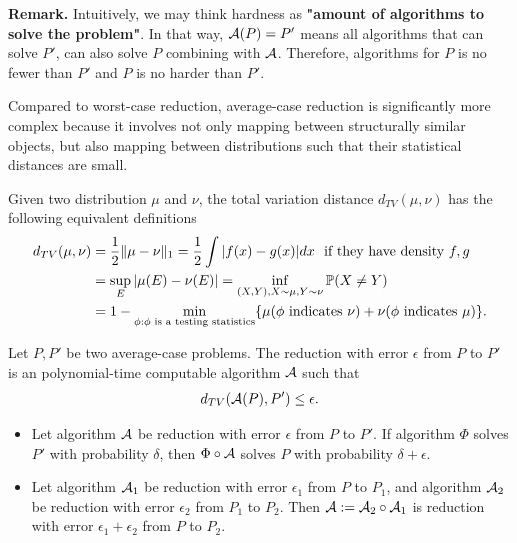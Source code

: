 \textbf{Remark.} Intuitively, we may think hardness as \textbf{"amount of algorithms to solve the problem"}. In that way, $\mathcal{A}(P) = P'$ means all algorithms that can solve $P'$, can also solve $P$ combining with $\mathcal{A}$. Therefore, algorithms for $P$ is no fewer than $P'$ and $P$ is no harder than $P'$.

Compared to worst-case reduction, average-case reduction is significantly more complex because it involves not only mapping between structurally similar objects, but also mapping between distributions such that their statistical distances are small.

\begin{lem}
    Given two distribution $\mu$ and $\nu$, the total variation distance $d_{TV}(\mu,\nu)$ has the following equivalent definitions
    \begin{align*}
        d_{TV}(\mu,\nu) &= \frac{1}{2}\|\mu-\nu\|_1 
                        = \frac{1}{2}\int |f(x)-g(x)|dx ~~\text{if they have density $f,g$}\\
                        &= \sup_{E}|\mu(E) - \nu(E)| 
                        = \inf_{(X,Y),X\sim\mu,Y\sim\nu}\mathbb{P}(X\neq Y)\\
                        &=1- \min_{\phi:\phi\text{ is a testing statistics}}\{\mu(\phi\text{ indicates }\nu)+\nu(\phi\text{ indicates }\mu)\}.
    \end{align*}
\end{lem}

\begin{defn}[Reduction]
    Let $P, P'$ be two average-case problems. The reduction with error $\epsilon$ from $P$ to $P'$ is an polynomial-time computable algorithm $\mathcal{A}$ such that
    \[
        d_{TV}(\mathcal{A}(P), P')\le\epsilon.
    \]
\end{defn}

\begin{lem}
    \label{property_redu}
    \begin{itemize}
        \item  Let algorithm $\mathcal{A}$ be reduction with error $\epsilon$ from $P$ to $P'$. If algorithm $\Phi$ solves $P'$ with probability $\delta$, then $\Phi\circ\mathcal{A}$ solves $P$ with probability $\delta+\epsilon$.
        \item  Let algorithm $\mathcal{A}_1$ be reduction with error $\epsilon_1$ from $P$ to $P_1$, and algorithm $\mathcal{A}_2$ be reduction with error $\epsilon_2$ from $P_1$ to $P_2$. Then $\mathcal{A}:=\mathcal{A}_2\circ \mathcal{A}_1$ is reduction with error $\epsilon_1+\epsilon_2$ from $P$ to $P_2$.
    \end{itemize}
\end{lem}

